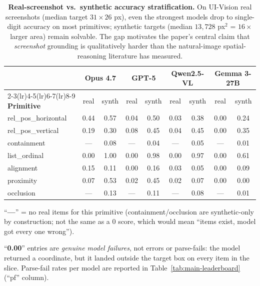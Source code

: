 \begin{table}[t]
\centering
\small
\begin{threeparttable}
\caption{\textbf{Real-screenshot vs.\ synthetic accuracy stratification.}
On UI-Vision real screenshots (median target $31{\times}26$ px), even the
strongest models drop to single-digit accuracy on most primitives;
synthetic targets (median $13{,}728$ px$^2$ = $16{\times}$ larger area)
remain solvable. The gap motivates the paper's central claim that
\emph{screenshot} grounding is qualitatively harder than the natural-image
spatial-reasoning literature has measured.}
\label{tab:real-vs-synth}
\begin{tabular}{@{}lcccccccc@{}}
\toprule
& \multicolumn{2}{c}{\textbf{Opus 4.7}} & \multicolumn{2}{c}{\textbf{GPT-5}} &
\multicolumn{2}{c}{\textbf{Qwen2.5-VL}} & \multicolumn{2}{c}{\textbf{Gemma 3-27B}} \\
\cmidrule(lr){2-3}\cmidrule(lr){4-5}\cmidrule(lr){6-7}\cmidrule(lr){8-9}
\textbf{Primitive} & real & synth & real & synth & real & synth & real & synth \\
\midrule
rel\_pos\_horizontal & 0.44 & 0.57 & 0.04 & 0.50 & 0.03 & 0.38 & 0.00 & 0.24 \\
rel\_pos\_vertical   & 0.19 & 0.30 & 0.08 & 0.45 & 0.04 & 0.45 & 0.00 & 0.35 \\
containment          & ---  & 0.08 & ---  & 0.04 & ---  & 0.05 & ---  & 0.01 \\
list\_ordinal        & 0.00 & 1.00 & 0.00 & 0.98 & 0.00 & 0.97 & 0.00 & 0.61 \\
alignment            & 0.15 & 0.11 & 0.00 & 0.16 & 0.03 & 0.05 & 0.00 & 0.09 \\
proximity            & 0.07 & 0.53 & 0.02 & 0.45 & 0.02 & 0.07 & 0.00 & 0.00 \\
occlusion            & ---  & 0.13 & ---  & 0.11 & ---  & 0.08 & ---  & 0.01 \\
\bottomrule
\end{tabular}
\begin{tablenotes}
\footnotesize
\item ``\textbf{---}'' = no real items for this primitive
(containment/occlusion are synthetic-only by construction; not the same
as a $0$ score, which would mean ``items exist, model got every one wrong'').
\item ``\textbf{0.00}'' entries are \emph{genuine model failures}, not
errors or parse-fails: the model returned a coordinate, but it landed
outside the target box on every item in the slice. Parse-fail rates
per model are reported in Table~\ref{tab:main-leaderboard} (``pf'' column).
\end{tablenotes}
\end{threeparttable}
\end{table}


